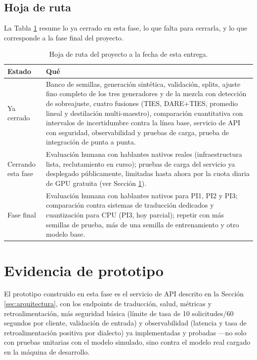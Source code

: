 \documentclass[11pt,a4paper]{article}
\begin{document}
\subsection{Hoja de ruta}

La Tabla \ref{tab:roadmap} resume lo ya cerrado en esta fase, lo que falta para cerrarla, y lo que corresponde a la fase final del proyecto.

\begin{table}[h]
\centering
\small
\begin{tabular}{p{2.6cm}p{10.4cm}}
\toprule
\textbf{Estado} & \textbf{Qué} \\
\midrule
Ya cerrado & Banco de semillas, generación sintética, validación, splits, ajuste fino completo de los tres generadores y de la mezcla con detección de sobreajuste, cuatro fusiones (TIES, DARE+TIES, promedio lineal y destilación multi-maestro), comparación cuantitativa con intervalos de incertidumbre contra la línea base, servicio de API con seguridad, observabilidad y pruebas de carga, prueba de integración de punta a punta. \\
\addlinespace
Cerrando esta fase & Evaluación humana con hablantes nativos reales (infraestructura lista, reclutamiento en curso); pruebas de carga del servicio ya desplegado públicamente, limitadas hasta ahora por la cuota diaria de GPU gratuita (ver Sección \ref{sec:prototipo}). \\
\addlinespace
Fase final & Evaluación humana con hablantes nativos para PI1, PI2 y PI3; comparación contra sistemas de traducción dedicados y cuantización para CPU (PI3, hoy parcial); repetir con más semillas de prueba, más de una semilla de entrenamiento y otro modelo base. \\
\bottomrule
\end{tabular}
\caption{Hoja de ruta del proyecto a la fecha de esta entrega.}
\label{tab:roadmap}
\end{table}

\section{Evidencia de prototipo}
\label{sec:prototipo}

El prototipo construido en esta fase es el servicio de API descrito en la Sección \ref{sec:arquitectura}, con los endpoints de traducción, salud, métricas y retroalimentación, más seguridad básica (límite de tasa de 10 solicitudes/60 segundos por cliente, validación de entrada) y observabilidad (latencia y tasa de retroalimentación positiva por dialecto) ya implementadas y probadas —no solo con pruebas unitarias con el modelo simulado, sino contra el modelo real cargado en la máquina de desarrollo.
\end{document}
